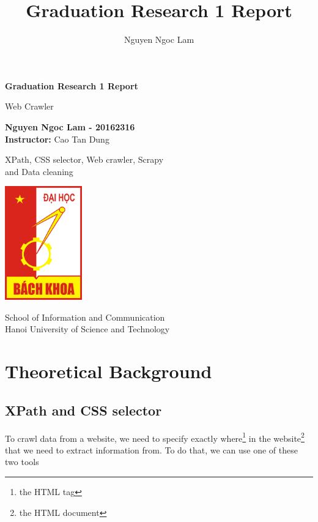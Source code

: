 \documentclass[11pt,a4paper]{report}
\title{Graduation Research 1 Report}
\date{\displaydate{date}}
\author{Nguyen Ngoc Lam}
\begin{document}
\begin{titlepage}
	\begin{center}
		\vspace*{0.5cm}
		\Huge
		\textbf{Graduation Research 1 Report}

		\vspace{0.5cm}
		\LARGE
		Web Crawler
            
		\vspace{1.5cm}

		\textbf{Nguyen Ngoc Lam - 20162316}\\
		\textbf{Instructor: }Cao Tan Dung

		\vfill
            
        XPath, CSS selector, Web crawler, Scrapy\\and Data cleaning     
		\vspace{0.8cm}
     
		\includegraphics[width=0.25\textwidth]{Logo_Hust.png}

		\Large
		School of Information and Communication\\
		Hanoi University of Science and Technology\\
	\end{center}
\end{titlepage}
\newpage
{}
\tableofcontents
\newpage
\chapter{Theoretical Background}
\newpage
\section{XPath and CSS selector}
To crawl data from a website, we need to specify exactly where\footnote{the HTML tag} in the website\footnote{the HTML document} that we need to extract information from. To do that, we can use one of these two tools
\end{document}
